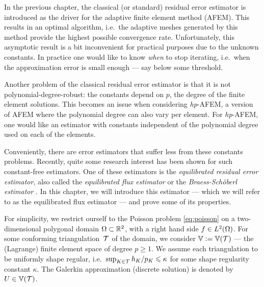 \documentclass[thesis.tex]{subfiles}
\begin{document}
In the previous chapter, the classical (or standard) residual error estimator is introduced as the driver for the
adaptive finite element method (AFEM). This results in an optimal algorithm, i.e.~the adaptive meshes
generated by this method provide the highest possible convergence rate. Unfortunately, this asymptotic result
is a bit inconvenient for practical purposes due to the unknown constants. In practice
one would like to know \emph{when} to stop iterating, i.e.~when the approximation error is small enough --- say
below some threshold. 

Another problem of the classical residual error estimator is that it is not polynomial-degree-robust: 
the constants depend on $p$, the degree of the finite element solutions. This becomes an issue
when considering \emph{hp}-AFEM, a version of AFEM where the polynomial degree can also vary
per element. For \emph{hp}-AFEM, one would like an estimator with constants independent of the polynomial degree
used on each of the elements.

Conveniently, there are error estimators that suffer less from these constants problems. Recently, quite
some research interest has been shown for such constant-free estimators. One of these estimators is the
\emph{equilibrated residual error estimator}, also called the \emph{equilibrated flux estimator} or the \emph{Braess-Sch\"oberl estimator}
\cite{braessequil, braessequilrobust,ernequil}.
In this chapter, we will introduce this estimator --- which we will refer to as the equilibrated flux estimator --- and prove some
of its properties. 

For simplicity, we restrict ourself to the Poisson problem \eqref{eq:poisson} on a two-dimensional polygonal domain $\Omega \subset \mathbb{R}^2$,
with a right hand side $f \in L^2(\Omega)$. For some conforming triangulation~$\mathcal{T}$ of the domain,  we consider $\mathbb{V} := \mathbb{V}(\mathcal{T})$ --- the (Lagrange) finite
element space of degree $p\geq 1$. We assume each triangulation to be uniformly shape regular, i.e.~$\sup_{K \in \mathcal{T}} h_K/p_K \leqslant \kappa$ for
some shape regularity constant $\kappa$.
The Galerkin approximation (discrete solution) is denoted by $U \in \mathbb{V}(\mathcal{T})$.
\end{document}

